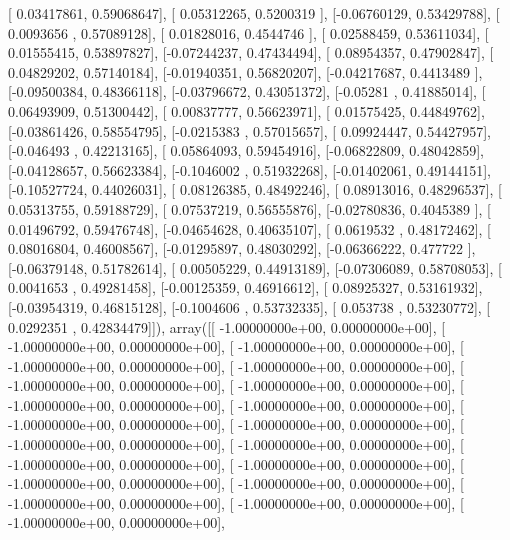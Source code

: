 \documentclass{article}
\begin{document}
       [ 0.03417861,  0.59068647],
       [ 0.05312265,  0.5200319 ],
       [-0.06760129,  0.53429788],
       [ 0.0093656 ,  0.57089128],
       [ 0.01828016,  0.4544746 ],
       [ 0.02588459,  0.53611034],
       [ 0.01555415,  0.53897827],
       [-0.07244237,  0.47434494],
       [ 0.08954357,  0.47902847],
       [ 0.04829202,  0.57140184],
       [-0.01940351,  0.56820207],
       [-0.04217687,  0.4413489 ],
       [-0.09500384,  0.48366118],
       [-0.03796672,  0.43051372],
       [-0.05281   ,  0.41885014],
       [ 0.06493909,  0.51300442],
       [ 0.00837777,  0.56623971],
       [ 0.01575425,  0.44849762],
       [-0.03861426,  0.58554795],
       [-0.0215383 ,  0.57015657],
       [ 0.09924447,  0.54427957],
       [-0.046493  ,  0.42213165],
       [ 0.05864093,  0.59454916],
       [-0.06822809,  0.48042859],
       [-0.04128657,  0.56623384],
       [-0.1046002 ,  0.51932268],
       [-0.01402061,  0.49144151],
       [-0.10527724,  0.44026031],
       [ 0.08126385,  0.48492246],
       [ 0.08913016,  0.48296537],
       [ 0.05313755,  0.59188729],
       [ 0.07537219,  0.56555876],
       [-0.02780836,  0.4045389 ],
       [ 0.01496792,  0.59476748],
       [-0.04654628,  0.40635107],
       [ 0.0619532 ,  0.48172462],
       [ 0.08016804,  0.46008567],
       [-0.01295897,  0.48030292],
       [-0.06366222,  0.477722  ],
       [-0.06379148,  0.51782614],
       [ 0.00505229,  0.44913189],
       [-0.07306089,  0.58708053],
       [ 0.0041653 ,  0.49281458],
       [-0.00125359,  0.46916612],
       [ 0.08925327,  0.53161932],
       [-0.03954319,  0.46815128],
       [-0.1004606 ,  0.53732335],
       [ 0.053738  ,  0.53230772],
       [ 0.0292351 ,  0.42834479]]), array([[ -1.00000000e+00,   0.00000000e+00],
       [ -1.00000000e+00,   0.00000000e+00],
       [ -1.00000000e+00,   0.00000000e+00],
       [ -1.00000000e+00,   0.00000000e+00],
       [ -1.00000000e+00,   0.00000000e+00],
       [ -1.00000000e+00,   0.00000000e+00],
       [ -1.00000000e+00,   0.00000000e+00],
       [ -1.00000000e+00,   0.00000000e+00],
       [ -1.00000000e+00,   0.00000000e+00],
       [ -1.00000000e+00,   0.00000000e+00],
       [ -1.00000000e+00,   0.00000000e+00],
       [ -1.00000000e+00,   0.00000000e+00],
       [ -1.00000000e+00,   0.00000000e+00],
       [ -1.00000000e+00,   0.00000000e+00],
       [ -1.00000000e+00,   0.00000000e+00],
       [ -1.00000000e+00,   0.00000000e+00],
       [ -1.00000000e+00,   0.00000000e+00],
       [ -1.00000000e+00,   0.00000000e+00],
       [ -1.00000000e+00,   0.00000000e+00],
       [ -1.00000000e+00,   0.00000000e+00],
\end{document}
